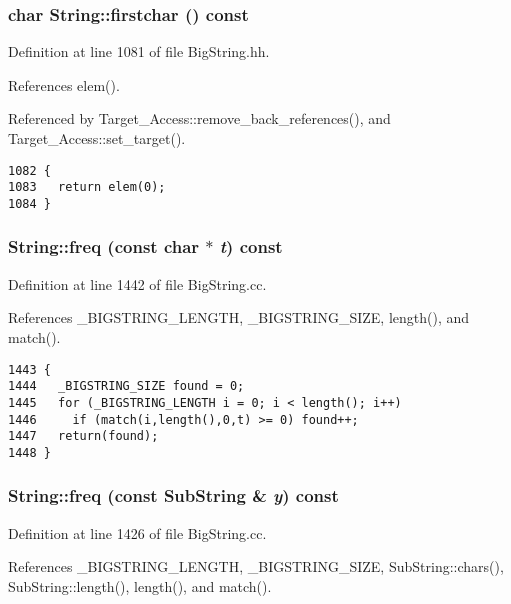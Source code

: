 \subsubsection{\setlength{\rightskip}{0pt plus 5cm}char String::firstchar () const\hspace{0.3cm}{\tt  [inline]}}\label{classString_a101}




Definition at line 1081 of file Big\-String.hh.

References elem().

Referenced by Target\_\-Access::remove\_\-back\_\-references(), and Target\_\-Access::set\_\-target().



\footnotesize\begin{verbatim}1082 { 
1083   return elem(0);
1084 }
\end{verbatim}\normalsize 
{}
\subsubsection{ String::freq (const char $\ast$ {\em t}) const}\label{classString_a50}




Definition at line 1442 of file Big\-String.cc.

References \_\-BIGSTRING\_\-LENGTH, \_\-BIGSTRING\_\-SIZE, length(), and match().



\footnotesize\begin{verbatim}1443 {
1444   _BIGSTRING_SIZE found = 0;
1445   for (_BIGSTRING_LENGTH i = 0; i < length(); i++) 
1446     if (match(i,length(),0,t) >= 0) found++;
1447   return(found);
1448 }
\end{verbatim}\normalsize 
{}
\subsubsection{ String::freq (const {\bf Sub\-String} \& {\em y}) const}\label{classString_a49}




Definition at line 1426 of file Big\-String.cc.

References \_\-BIGSTRING\_\-LENGTH, \_\-BIGSTRING\_\-SIZE, Sub\-String::chars(), Sub\-String::length(), length(), and match().



